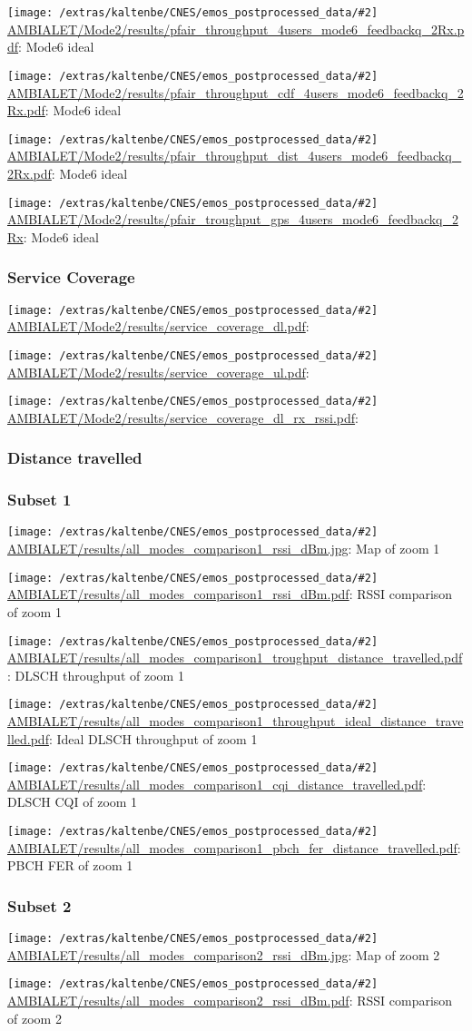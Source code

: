 \documentclass[a4paper,10pt]{article}
\newcommand{\printfile}[2][]{
 \begin{minipage}{8cm}
  \centering
  \texttt{[image: /extras/kaltenbe/CNES/emos\_postprocessed\_data/\#2]}
  \url{#2}: #1

 \end{minipage}
}
\begin{document}
\printfile[Mode6 ideal]{AMBIALET/Mode2/results/pfair_throughput_4users_mode6_feedbackq_2Rx.pdf}
\printfile[Mode6 ideal]{AMBIALET/Mode2/results/pfair_throughput_cdf_4users_mode6_feedbackq_2Rx.pdf}

\printfile[Mode6 ideal]{AMBIALET/Mode2/results/pfair_throughput_dist_4users_mode6_feedbackq_2Rx.pdf}
\printfile[Mode6 ideal]{AMBIALET/Mode2/results/pfair_troughput_gps_4users_mode6_feedbackq_2Rx}

\subsubsection{Service Coverage}

\printfile{AMBIALET/Mode2/results/service_coverage_dl.pdf}
\printfile{AMBIALET/Mode2/results/service_coverage_ul.pdf}

\printfile{AMBIALET/Mode2/results/service_coverage_dl_rx_rssi.pdf}

\subsubsection{Distance travelled}
\label{sec:dist_travelled_ambialet}

\subsubsection*{Subset 1}

\printfile[Map of zoom 1]{AMBIALET/results/all_modes_comparison1_rssi_dBm.jpg}
\printfile[RSSI comparison of zoom 1]{AMBIALET/results/all_modes_comparison1_rssi_dBm.pdf}

\printfile[DLSCH throughput of zoom 1]{AMBIALET/results/all_modes_comparison1_troughput_distance_travelled.pdf}
\printfile[Ideal DLSCH throughput of zoom 1]{AMBIALET/results/all_modes_comparison1_throughput_ideal_distance_travelled.pdf}

\printfile[DLSCH CQI of zoom 1]{AMBIALET/results/all_modes_comparison1_cqi_distance_travelled.pdf}
\printfile[PBCH FER of zoom 1]{AMBIALET/results/all_modes_comparison1_pbch_fer_distance_travelled.pdf}

\subsubsection*{Subset 2}

\printfile[Map of zoom 2]{AMBIALET/results/all_modes_comparison2_rssi_dBm.jpg}
\printfile[RSSI comparison of zoom 2]{AMBIALET/results/all_modes_comparison2_rssi_dBm.pdf}
\end{document}
